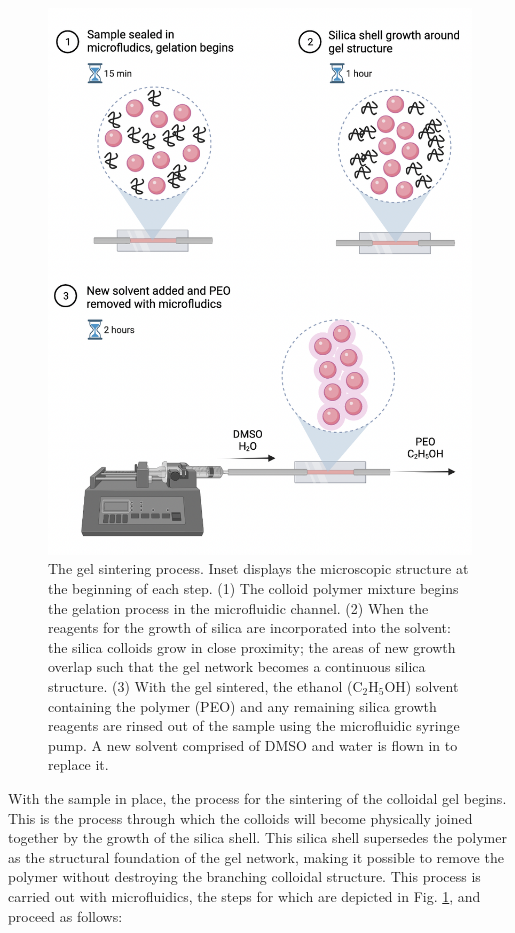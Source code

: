 \begin{figure}
	\centering
	\includegraphics[width=0.8\linewidth]{figsExpSystem/figSintering.png}
	\caption[The gel sintering process]{The gel sintering process. Inset displays the microscopic structure at the beginning of each step. (1) The colloid polymer mixture begins the gelation process in the microfluidic channel. (2) When the reagents for the growth of silica are incorporated into the solvent: the silica colloids grow in close proximity; the areas of new growth overlap such that the gel network becomes a continuous silica structure. (3) With the gel sintered, the ethanol (C$_{2}$H$_{5}$OH) solvent containing the polymer (PEO) and any remaining silica growth reagents are rinsed out of the sample using the microfluidic syringe pump. A new solvent comprised of DMSO and water is flown in to replace it. }
	\label{fig:Sintering}
\end{figure}

With the sample in place, the process for the sintering of the colloidal gel begins. This is the process through which the colloids will become physically joined together by the growth of the silica shell. This silica shell supersedes the polymer as the structural foundation of the gel network, making it possible to remove the polymer without destroying the branching colloidal structure. This process is carried out with microfluidics, the steps for which are depicted in Fig. \ref{fig:Sintering}, and proceed as follows:


